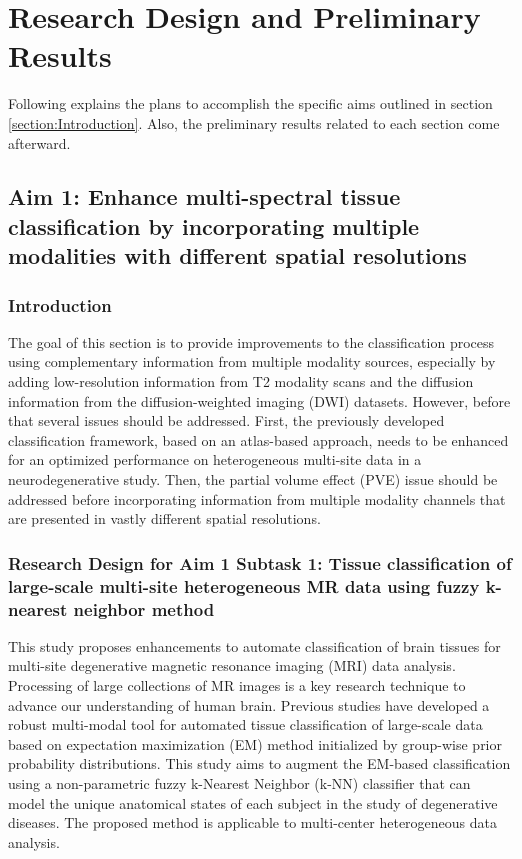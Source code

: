 \section{Research Design and Preliminary Results}
Following explains the plans to accomplish the specific aims outlined in section \ref{section:Introduction}. Also, the preliminary results related to each section come afterward.

\subsection{Aim 1: Enhance multi-spectral tissue classification by incorporating multiple modalities with different spatial resolutions}
\label{section:Aim1ResearchDesign}

\subsubsection{Introduction}
\label{section:Aim1Intro}
The goal of this section is to provide improvements to the classification process using complementary information from multiple modality sources, especially by adding low-resolution information from T2 modality scans and  the diffusion information from the diffusion-weighted imaging (DWI) datasets.
However, before that several issues should be addressed. First, the previously developed classification framework, based on an atlas-based approach, needs to be enhanced for an optimized performance on heterogeneous multi-site data in a neurodegenerative study. Then, the partial volume effect (PVE) issue should be addressed before incorporating information from multiple modality channels that are presented in vastly different spatial resolutions.

\subsubsection{Research Design for Aim 1 Subtask 1: Tissue classification of large-scale multi-site heterogeneous MR data using fuzzy k-nearest neighbor method}
\label{section:Aim1Subtask1ResearchDesign}

This study proposes enhancements to automate classification of brain tissues for multi-site degenerative magnetic resonance imaging (MRI) data analysis.
Processing of large collections of MR images is a key research technique to advance our understanding of human brain. Previous studies have developed a robust multi-modal tool for automated tissue classification of large-scale data based on expectation maximization (EM) method initialized by group-wise prior probability distributions.
This study aims to augment the EM-based classification using a non-parametric fuzzy k-Nearest Neighbor (k-NN) classifier that can model the unique anatomical states of each subject in the study of degenerative diseases. The proposed method is applicable to multi-center heterogeneous data analysis.


